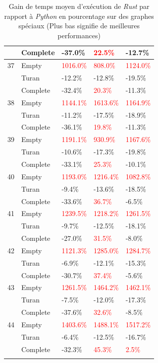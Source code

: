 \documentclass[12pt,a4paper]{article}
\begin{document}
\begin{longtable}{|l||l|l|l|l|}
  & Complete & -37.0\% & \textcolor{red}{22.5\%} & -12.7\% \\
  \hline
  37 & Empty & \textcolor{red}{1016.0\%} & \textcolor{red}{808.0\%} & \textcolor{red}{1124.0\%} \\
  & Turan & -12.2\% & -12.8\% & -19.5\% \\
  & Complete & -32.4\% & \textcolor{red}{20.3\%} & -11.3\% \\
  \hline
  38 & Empty & \textcolor{red}{1144.1\%} & \textcolor{red}{1613.6\%} & \textcolor{red}{1164.9\%} \\
  & Turan & -11.2\% & -17.5\% & -18.9\% \\
  & Complete & -36.1\% & \textcolor{red}{19.8\%} & -11.3\% \\
  \hline
  39 & Empty & \textcolor{red}{1191.1\%} & \textcolor{red}{930.9\%} & \textcolor{red}{1167.6\%} \\
  & Turan & -10.6\% & -17.3\% & -19.8\% \\
  & Complete & -33.1\% & \textcolor{red}{25.3\%} & -10.1\% \\
  \hline
  40 & Empty & \textcolor{red}{1193.0\%} & \textcolor{red}{1216.4\%} & \textcolor{red}{1082.8\%} \\
  & Turan & -9.4\% & -13.6\% & -18.5\% \\
  & Complete & -33.6\% & \textcolor{red}{36.7\%} & -6.5\% \\
  \hline
  41 & Empty & \textcolor{red}{1239.5\%} & \textcolor{red}{1218.2\%} & \textcolor{red}{1261.5\%} \\
  & Turan & -9.7\% & -12.5\% & -18.1\% \\
  & Complete & -27.0\% & \textcolor{red}{31.5\%} & -8.0\% \\
  \hline
  42 & Empty & \textcolor{red}{1121.3\%} & \textcolor{red}{1285.0\%} & \textcolor{red}{1284.7\%} \\
  & Turan & -6.9\% & -12.1\% & -15.3\% \\
  & Complete & -30.7\% & \textcolor{red}{37.4\%} & -5.6\% \\
  \hline
  43 & Empty & \textcolor{red}{1261.5\%} & \textcolor{red}{1464.2\%} & \textcolor{red}{1462.1\%} \\
  & Turan & -7.5\% & -12.0\% & -17.3\% \\
  & Complete & -37.6\% & \textcolor{red}{32.6\%} & -8.5\% \\
  \hline
  44 & Empty & \textcolor{red}{1403.6\%} & \textcolor{red}{1488.1\%} & \textcolor{red}{1517.2\%} \\
  & Turan & -6.4\% & -12.5\% & -16.7\% \\
  & Complete & -32.3\% & \textcolor{red}{45.3\%} & \textcolor{red}{2.5\%} \\
  \hline
  \caption{Gain de temps moyen d'exécution de \emph{Rust} par rapport à \emph{Python} en pourcentage sur des graphes spéciaux (Plus bas signifie de meilleures performances)}
\end{longtable}
\end{document}
